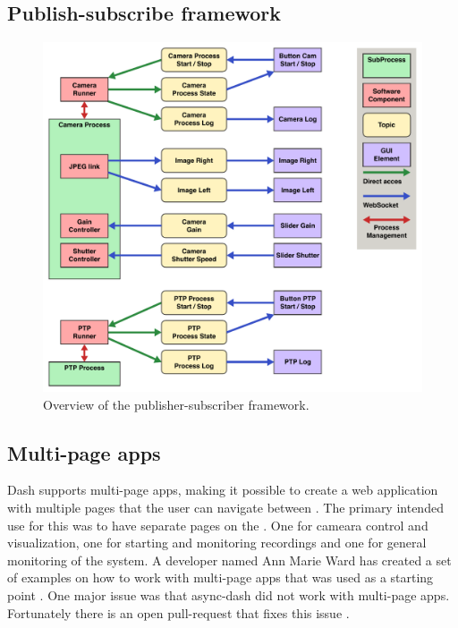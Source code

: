 \subsection{Publish-subscribe framework}
\begin{figure}[H]
    \centering
    \includegraphics[width=\textwidth]{figures/gui/pubsub_graph.pdf}
    \caption{Overview of the publisher-subscriber framework.}
    \label{fig:pub_sub_graph}
\end{figure}

\subsection{Multi-page apps}
Dash supports multi-page apps, making it possible to create a web application with multiple pages that the user can navigate between \cite{plotlyMultiPageAppsURL}.
The primary intended use for this was to have separate pages on the \srgui.
One for cameara control and visualization, one for starting and monitoring recordings and one for general monitoring of the system.
A developer named Ann Marie Ward has created a set of examples on how to work with multi-page apps that was used as a starting point \cite{wardExamplesMultipageApps03Jul22}.
One major issue was that \gls{async-dash} did not work with multi-page apps.
Fortunately there is an open pull-request that fixes this issue \cite{lekAddFlaskRequest2022}.
